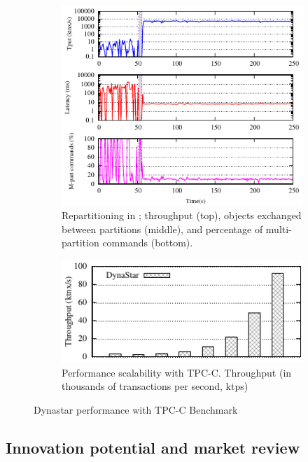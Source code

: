 \begin{figure}[ht!]
  \centering
  \begin{subfigure}{.48\textwidth}
    \centering
    \includegraphics[width=0.8\columnwidth]{figures/tpcc-detail-dynastar}
  \caption{Repartitioning in \dynastar; throughput (top), objects exchanged
  between partitions (middle), and percentage of multi-partition commands
  (bottom).}
  \end{subfigure}
  \begin{subfigure}{.48\textwidth}
    \centering
    \includegraphics[width=\textwidth]{./figures/tpcc-scaling-tp-lat-bridge}
    \caption{Performance scalability with TPC-C. Throughput (in thousands of transactions per second, ktps)}
  \end{subfigure}
  \caption{Dynastar performance with TPC-C Benchmark}
  \label{fig:tpcc}
\end{figure}

\subsection{Innovation potential and market review} 

